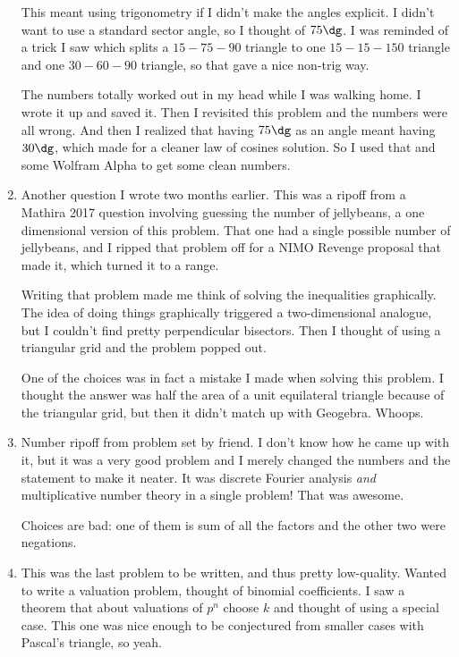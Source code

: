 \documentclass[10pt,paper=letter]{scrartcl}
\begin{document}
\begin{enumerate}
  This meant using trigonometry if I didn't make the angles explicit. I didn't want to use a standard sector angle, so I thought of $75\dg$. I was reminded of a trick I saw which splits a $15-75-90$ triangle to one $15-15-150$ triangle and one $30-60-90$ triangle, so that gave a nice non-trig way. 

  The numbers totally worked out in my head while I was walking home. I wrote it up and saved it. Then I revisited this problem and the numbers were all wrong. And then I realized that having $75\dg$ as an angle meant having $30\dg$, which made for a cleaner law of cosines solution. So I used that and some Wolfram Alpha to get some clean numbers. 

  \item Another question I wrote two months earlier. This was a ripoff from a Mathira 2017 question involving guessing the number of jellybeans, a one dimensional version of this problem. That one had a single possible number of jellybeans, and I ripped that problem off for a NIMO Revenge proposal that made it, which turned it to a range.

  Writing that problem made me think of solving the inequalities graphically. The idea of doing things graphically triggered a two-dimensional analogue, but I couldn't find pretty perpendicular bisectors. Then I thought of using a triangular grid and the problem popped out.

  One of the choices was in fact a mistake I made when solving this problem. I thought the answer was half the area of a unit equilateral triangle because of the triangular grid, but then it didn't match up with Geogebra. Whoops.

  \item Number ripoff from problem set by friend. I don't know how he came up with it, but it was a very good problem and I merely changed the numbers and the statement to make it neater. It was discrete Fourier analysis \emph{and} multiplicative number theory in a single problem! That was awesome.

  Choices are bad: one of them is sum of all the factors and the other two were negations.

  \item This was the last problem to be written, and thus pretty low-quality. Wanted to write a valuation problem, thought of binomial coefficients. I saw a theorem that about valuations of $p^n$ choose $k$ and thought of using a special case. This one was nice enough to be conjectured from smaller cases with Pascal's triangle, so yeah.


\end{enumerate}
\end{document}
